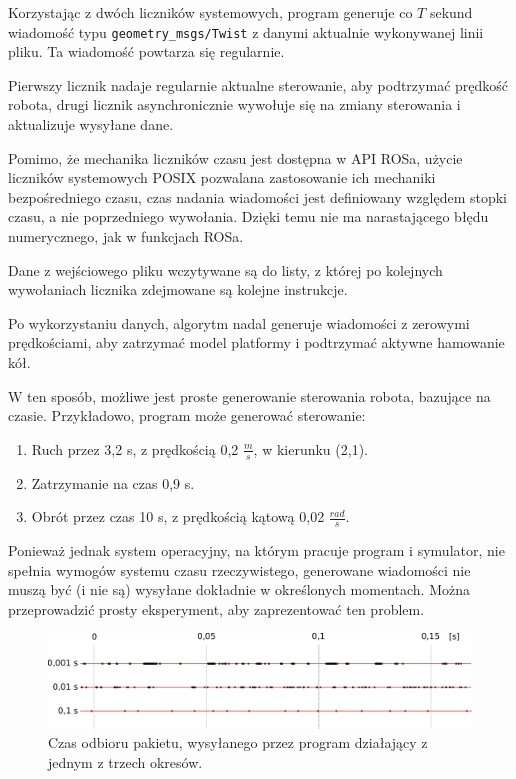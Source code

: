 	Korzystając z dwóch liczników systemowych, program generuje co $T$ sekund wiadomość typu \texttt{geometry\_msgs/Twist} z danymi aktualnie wykonywanej linii pliku.
	Ta wiadomość powtarza się regularnie.
	
	Pierwszy licznik nadaje regularnie aktualne sterowanie, aby podtrzymać prędkość robota, drugi licznik asynchronicznie wywołuje się na zmiany sterowania i aktualizuje wysyłane dane.
	
	Pomimo, że mechanika liczników czasu jest dostępna w API ROSa, użycie liczników systemowych POSIX pozwalana zastosowanie ich mechaniki bezpośredniego czasu,
	czas nadania wiadomości jest definiowany względem stopki czasu, a nie poprzedniego wywołania.
	Dzięki temu nie ma narastającego błędu numerycznego, jak w funkcjach ROSa. 
	
	Dane z wejściowego pliku wczytywane są do listy, z której po kolejnych wywołaniach licznika zdejmowane są kolejne instrukcje.
	
	Po wykorzystaniu danych, algorytm nadal generuje wiadomości z zerowymi prędkościami, aby zatrzymać model platformy i podtrzymać aktywne hamowanie kół.
	
	W ten sposób, możliwe jest proste generowanie sterowania robota, bazujące na czasie.
	Przykładowo, program może generować sterowanie:
	\begin{enumerate}
		\item Ruch przez 3,2 s, z prędkością 0,2 $\frac{m}{s}$, w kierunku (2,1).
		\item Zatrzymanie na czas 0,9 s.
		\item Obrót przez czas 10 s, z prędkością kątową 0,02 $\frac{rad}{s}$.
	\end{enumerate}
	
	Ponieważ jednak system operacyjny, na którym pracuje program i symulator, nie spełnia wymogów systemu czasu rzeczywistego, generowane wiadomości
	nie muszą być (i nie są) wysyłane dokładnie w określonych momentach. Można przeprowadzić prosty eksperyment, aby zaprezentować ten problem.
	
	\begin{figure}[H]
	\centering
	\includegraphics[width=\textwidth]{graphics/gramofon.pdf}
	\caption{Czas odbioru pakietu, wysyłanego przez program działający z jednym z trzech okresów.}
	\end{figure}
	
